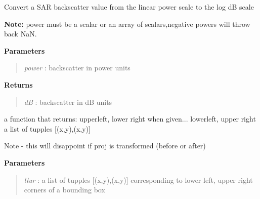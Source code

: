 \documentclass[letterpaper,10pt,openany,oneside]{sphinxmanual}
\begin{document}

\begin{fulllineitems}
\label{code:Util.getdBScale}
Convert a SAR backscatter value from the linear power scale to the log dB scale

\textbf{Note:} power must be a scalar or an array of scalars,negative powers will throw back NaN.

\textbf{Parameters}
\begin{quote}

\emph{power} : backscatter in power units
\end{quote}

\textbf{Returns}
\begin{quote}

\emph{dB}    : backscatter in dB units
\end{quote}

\end{fulllineitems}


\begin{fulllineitems}
\label{code:Util.llur2ullr}
a function that returns:
upperleft, lower right when given...
lowerleft, upper right
a list of tupples {[}(x,y),(x,y){]}

Note - this will disappoint if proj is transformed (before or after)

\textbf{Parameters}
\begin{quote}

\emph{llur} : a list of tupples {[}(x,y),(x,y){]} corresponding to lower left, upper right corners of a bounding box
\end{quote}

\end{fulllineitems}

\end{document}
